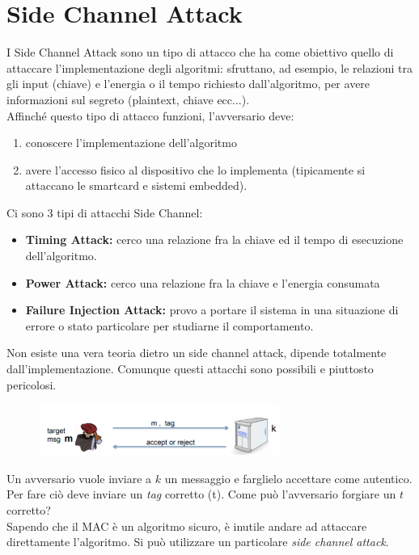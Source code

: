 \documentclass[a4paper,12pt]{article}
\begin{document}
\section{Side Channel Attack}
I Side Channel Attack sono un tipo di attacco che ha come obiettivo quello di attaccare l'implementazione degli algoritmi: sfruttano, ad esempio, le relazioni tra gli input (chiave) e l'energia o il tempo richiesto dall'algoritmo, per avere informazioni sul segreto (plaintext, chiave ecc...). \\
Affinché questo tipo di attacco funzioni, l'avversario deve:
\begin{enumerate}
	\item conoscere l'implementazione dell'algoritmo
	\item avere l'accesso fisico al dispositivo che lo implementa (tipicamente si attaccano le smartcard e sistemi embedded).
\end{enumerate}
Ci sono 3 tipi di attacchi Side Channel:
\begin{itemize}
	\item \textbf{Timing Attack:} cerco una relazione fra la chiave ed il tempo di esecuzione dell'algoritmo.
	\item \textbf{Power Attack:} cerco una relazione fra la chiave e l'energia consumata
	\item \textbf{Failure Injection Attack:} provo a portare il sistema in una situazione di errore o stato particolare per studiarne il comportamento.
\end{itemize}
Non esiste una vera teoria dietro un side channel attack, dipende totalmente dall'implementazione. Comunque questi attacchi sono possibili e piuttosto pericolosi.
\begin{figure}[H]
	\centering
	\includegraphics[width=0.7\textwidth]{img/side-channel.png}
\end{figure}
Un avversario vuole inviare a $k$ un messaggio e farglielo accettare come autentico. Per fare ciò deve inviare un \textit{tag} corretto (t).
Come può l'avversario forgiare un $t$ corretto? \\
Sapendo che il MAC è un algoritmo sicuro, è inutile andare ad attaccare direttamente l'algoritmo. Si può utilizzare un particolare \textit{side channel attack}.
\end{document}

